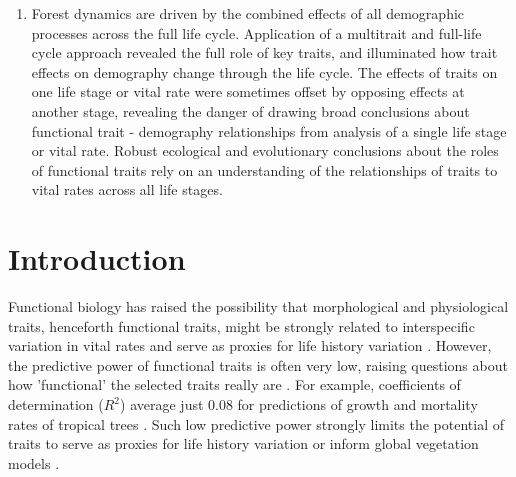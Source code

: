 \documentclass[b5paper,justified]{tufte-book} %
\begin{document}
\begin{fullwidth}
\begin{enumerate}
\item Forest dynamics are driven by the combined effects of all demographic processes across the full life cycle. Application of a multitrait and full-life cycle approach revealed the full role of key traits, and illuminated how trait effects on demography change through the life cycle. The effects of traits on one life stage or vital rate were sometimes offset by opposing effects at another stage, revealing the danger of drawing broad conclusions about functional trait - demography relationships from analysis of a single life stage or vital rate. Robust ecological and evolutionary conclusions about the roles of functional traits rely on an understanding of the relationships of traits to vital rates across all life stages.
\end{enumerate}


\section{Introduction}
Functional biology has raised the possibility that morphological and physiological traits, henceforth functional
traits, might be strongly related to interspecific variation in vital rates and serve as proxies for life history variation \citep{McIntyre1999, Westoby2002,  Westoby2006}. However, the predictive power of functional traits is often very low, raising questions about how 'functional' the selected traits really are \citep{Paine2015}. For
example, coefficients of determination ($R^2$) average just 0.08 for predictions of growth and mortality rates of
tropical trees \citep{Poorter2008, Wright2010, Iida2014a,Iida2014}. Such low predictive power strongly limits
the potential of traits to serve as proxies for life history variation or inform global vegetation models \citep{Cox2013, Friedlingstein2014}.


\end{fullwidth}
\end{document}

